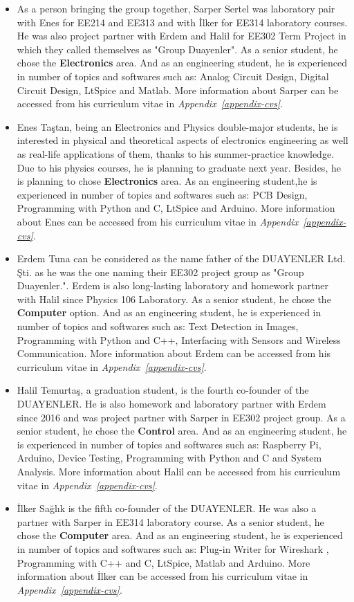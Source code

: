 \documentclass[a4paper,12pt]{article}
\begin{document}
\begin{itemize}
	\item As a person bringing the group together, Sarper Sertel was laboratory pair with Enes for EE214 and EE313 and with İlker for EE314 laboratory courses. He was also project partner with Erdem and Halil for EE302 Term Project in which they called themselves as "Group Duayenler". As a senior student, he chose the \textbf{Electronics} area. And as an engineering student, he is experienced in number of topics and softwares such as: Analog Circuit Design, Digital Circuit Design, LtSpice and Matlab. More information about Sarper can be accessed from his curriculum vitae in  \textit{Appendix~\ref{appendix-cvs}}.
	\item Enes Taştan, being an Electronics and Physics double-major students, he is  interested in physical and theoretical aspects of electronics engineering as well as real-life applications of them, thanks to his summer-practice knowledge. Due to his physics courses, he is planning to graduate next year. Besides, he is planning to chose \textbf{Electronics} area. As an engineering student,he is experienced in number of topics and softwares such as: PCB Design, Programming with Python and C, LtSpice and Arduino. More information about Enes can be accessed from his curriculum vitae in  \textit{Appendix~\ref{appendix-cvs}}.
	\item Erdem Tuna can be considered as the name father of the DUAYENLER Ltd. Şti. as he was the one naming their EE302 project group as "Group Duayenler.". Erdem is also long-lasting laboratory and homework partner with Halil since Physics 106 Laboratory. As a senior student, he chose the \textbf{Computer} option. And as an engineering student, he is experienced in number of topics and softwares such as: Text Detection in Images, Programming with Python and C++, Interfacing with Sensors and Wireless Communication. More information about Erdem can be accessed from his curriculum vitae in  \textit{Appendix~\ref{appendix-cvs}}.
	\item Halil Temurtaş, a graduation student, is the fourth co-founder of the DUAYENLER. He is also homework and laboratory partner with Erdem since 2016 and was project partner with Sarper in EE302 project group. As a senior student, he chose the \textbf{Control} area. And as an engineering student, he is experienced in number of topics and softwares such as: Raspberry Pi, Arduino, Device Testing, Programming with Python and C and System Analysis. More information about Halil can be accessed from his curriculum vitae in  \textit{Appendix~\ref{appendix-cvs}}.
	\item İlker Sağlık is the fifth co-founder of the DUAYENLER. He was also a partner with Sarper in EE314 laboratory course. As a senior student, he chose the \textbf{Computer} area. And as an engineering student, he is experienced in number of topics and softwares such as: Plug-in Writer for Wireshark , Programming with C++ and C, LtSpice, Matlab and Arduino. More information about İlker can be accessed from his curriculum vitae in  \textit{Appendix~\ref{appendix-cvs}}.
\end{itemize}
\end{document}
